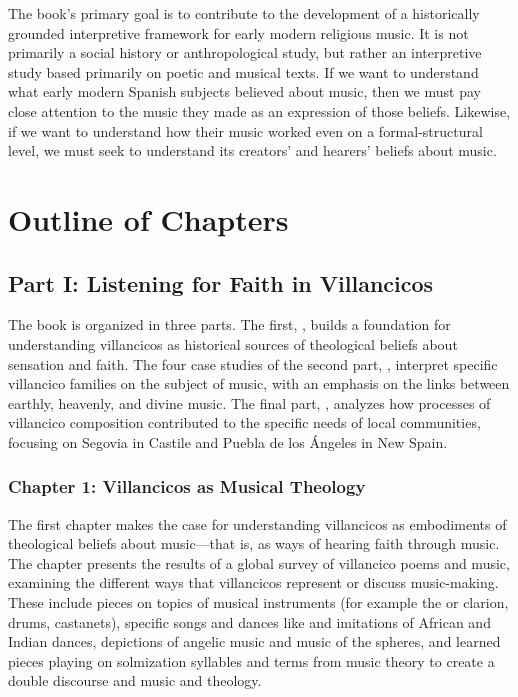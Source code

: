 \documentclass{vcbook-proposal}
\begin{document}
The book's primary goal is to contribute to the development of a historically grounded interpretive framework for early modern religious music.
It is not primarily a social history or anthropological study, but rather an interpretive study based primarily on poetic and musical texts.
If we want to understand what early modern Spanish subjects believed about music, then we must pay close attention to the music they made as an expression of those beliefs.
Likewise, if we want to understand how their music worked even on a formal-structural level, we must seek to understand its creators' and hearers' beliefs about music.


\section{Outline of Chapters}

\subsection{Part I: Listening for Faith in Villancicos}

The book is organized in three parts.
The first, , builds a foundation for understanding villancicos as historical sources of theological beliefs about sensation and faith.
The four case studies of the second part, , interpret specific villancico families on the subject of music, with an emphasis on the links between earthly, heavenly, and divine music.
The final part, , analyzes how processes of villancico composition contributed to the specific needs of local communities, focusing on Segovia in Castile and Puebla de los Ángeles in New Spain.

\subsubsection{Chapter 1: Villancicos as Musical Theology}

The first chapter makes the case for understanding villancicos as embodiments of theological beliefs about music---that is, as ways of hearing faith through music.
The chapter presents the results of a global survey of villancico poems and music, examining the different ways that villancicos represent or discuss music-making.
These include pieces on topics of musical instruments (for example the  or clarion, drums, castanets), specific songs and dances like  and imitations of African and Indian dances, depictions of angelic music and music of the spheres, and learned pieces playing on solmization syllables and terms from music theory to create a double discourse and music and theology.
\end{document}
